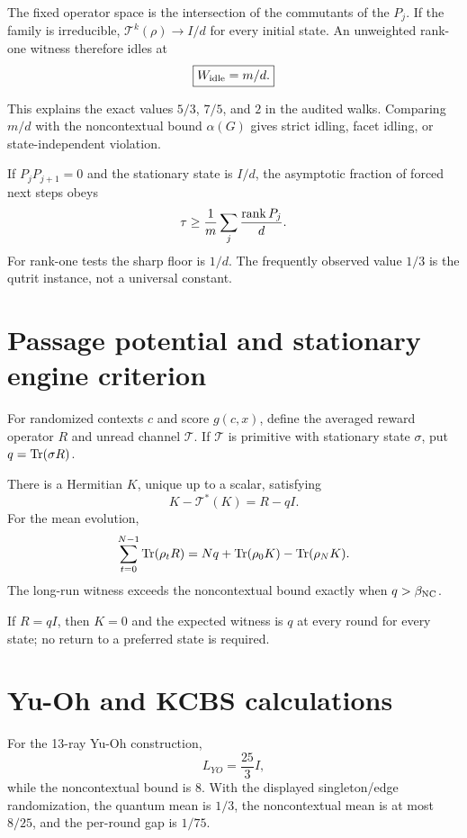 \documentclass[11pt,a4paper]{article}
\begin{document}
\begin{theorem}
The fixed operator space is the intersection of the commutants of the $P_j$. If the family is irreducible, $\mathcal T^k(\rho)\to I/d$ for every initial state. An unweighted rank-one witness therefore idles at
\begin{equation}
\boxed{W_{\rm idle}=m/d.}
\end{equation}
\end{theorem}
This explains the exact values $5/3$, $7/5$, and $2$ in the audited walks. Comparing $m/d$ with the noncontextual bound $\alpha(G)$ gives strict idling, facet idling, or state-independent violation.

\begin{theorem}
If $P_jP_{j+1}=0$ and the stationary state is $I/d$, the asymptotic fraction of forced next steps obeys
\begin{equation}
\tau\ge\frac1m\sum_j\frac{\operatorname{rank} P_j}{d}.
\end{equation}
For rank-one tests the sharp floor is $1/d$. The frequently observed value $1/3$ is the qutrit instance, not a universal constant.
\end{theorem}

\section{Passage potential and stationary engine criterion}
For randomized contexts $c$ and score $g(c,x)$, define the averaged reward operator $R$ and unread channel $\mathcal T$. If $\mathcal T$ is primitive with stationary state $\sigma$, put $q=\operatorname{Tr}(\sigma R)$.
\begin{theorem}
There is a Hermitian $K$, unique up to a scalar, satisfying
\begin{equation}
K-\mathcal T^*(K)=R-qI.
\end{equation}
For the mean evolution,
\begin{equation}
\sum_{t=0}^{N-1}\operatorname{Tr}(\rho_tR)=Nq+\operatorname{Tr}(\rho_0K)-\operatorname{Tr}(\rho_NK).
\end{equation}
The long-run witness exceeds the noncontextual bound exactly when $q>\beta_{\rm NC}$.
\end{theorem}
If $R=qI$, then $K=0$ and the expected witness is $q$ at every round for every state; no return to a preferred state is required.

\section{Yu-Oh and KCBS calculations}
For the 13-ray Yu-Oh construction,
\begin{equation}
L_{YO}=\frac{25}{3}I,
\end{equation}
while the noncontextual bound is $8$. With the displayed singleton/edge randomization, the quantum mean is $1/3$, the noncontextual mean is at most $8/25$, and the per-round gap is $1/75$.
\end{document}
